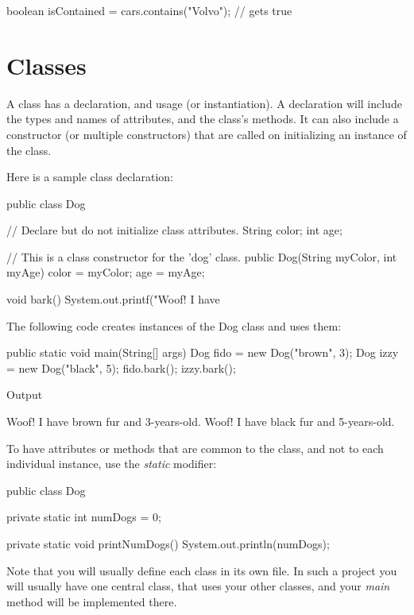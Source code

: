 \begin{code}
    boolean isContained = cars.contains("Volvo"); // gets true
\end{code}

\section{Classes}

A class has a declaration, and usage (or instantiation). A declaration will include the types and names of attributes, and the class's methods. It can also include a constructor (or multiple constructors) that are called on initializing an instance of the class.

Here is a sample class declaration:

\begin{code}
public class Dog {
    // Declare but do not initialize class attributes.
    String color;
    int age;
    
    // This is a class constructor for the 'dog' class.
    public Dog(String myColor, int myAge) {
    color = myColor;
    age = myAge;
    }
    
    void bark() {
    System.out.printf("Woof! I have %
    }
}
\end{code}


The following code creates instances of the Dog class and uses them:

\begin{code}
public static void main(String[] args) {
    Dog fido = new Dog("brown", 3);
    Dog izzy = new Dog("black", 5);
    fido.bark();
    izzy.bark();
}
\end{code}

Output
\begin{code}
Woof! I have brown fur and 3-years-old.
Woof! I have black fur and 5-years-old.
\end{code}

To have attributes or methods that are common to the class, and not to each individual instance, use the \textit{static} modifier:

\begin{code}
public class Dog {
    private static int numDogs = 0;
    
    private static void printNumDogs(){
        System.out.println(numDogs);
    }
}
\end{code}

Note that you will usually define each class in its own file. In such a project you will usually have one central class, that uses your other classes, and your \textit{main} method will be implemented there.

